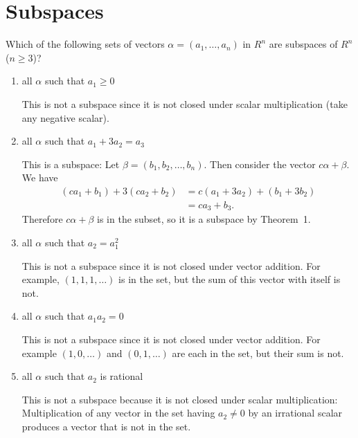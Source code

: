 \section{Subspaces}

 Which of the following sets of vectors
$\alpha = (a_1,\dots,a_n)$ in $R^n$ are subspaces of $R^n$ ($n\geq3$)?
\begin{enumerate}
\item all $\alpha$ such that $a_1\geq0$
  \begin{solution}
    This is not a subspace since it is not closed under scalar
    multiplication (take any negative scalar).
  \end{solution}
\item all $\alpha$ such that $a_1 + 3a_2 = a_3$
  \begin{solution}
    This is a subspace: Let $\beta = (b_1,b_2,\dots,b_n)$. Then
    consider the vector $c\alpha + \beta$. We have
    \begin{align*}
      (ca_1 + b_1) + 3(ca_2 + b_2)
      &= c(a_1 + 3a_2) + (b_1 + 3b_2) \\
      &= ca_3 + b_3.
    \end{align*}
    Therefore $c\alpha + \beta$ is in the subset, so it is a subspace
    by Theorem~1.
  \end{solution}
\item all $\alpha$ such that $a_2 = a_1^2$
  \begin{solution}
    This is not a subspace since it is not closed under vector
    addition. For example, $(1, 1, 1, \dots)$ is in the set, but the
    sum of this vector with itself is not.
  \end{solution}
\item all $\alpha$ such that $a_1a_2 = 0$
  \begin{solution}
    This is not a subspace since it is not closed under vector
    addition. For example $(1,0,\dots)$ and $(0,1,\dots)$ are each in
    the set, but their sum is not.
  \end{solution}
\item all $\alpha$ such that $a_2$ is rational
  \begin{solution}
    This is not a subspace because it is not closed under scalar
    multiplication: Multiplication of any vector in the set having
    $a_2\neq0$ by an irrational scalar produces a vector that is not
    in the set.
  \end{solution}
\end{enumerate}

